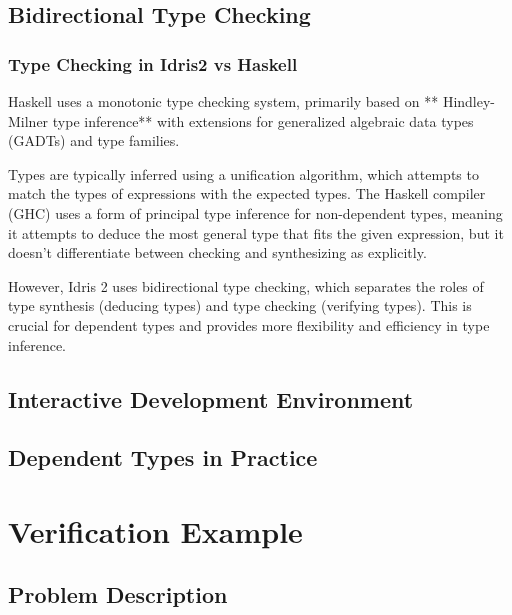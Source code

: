 \documentclass[]{rptuseminar}
\begin{document}
\subsection{Bidirectional Type Checking}
\subsubsection{Type Checking in Idris2 vs Haskell}
Haskell uses a monotonic type checking system, primarily based on ** Hindley-Milner type inference** with extensions for generalized algebraic data types (GADTs) and type families.

Types are typically inferred using a unification algorithm, which attempts to match the types of expressions with the expected types.
The Haskell compiler (GHC) uses a form of principal type inference for non-dependent types, meaning it attempts to deduce the most general type that fits the given expression, but it doesn't differentiate between checking and synthesizing as explicitly.

However, Idris 2 uses bidirectional type checking, which separates the roles of type synthesis (deducing types) and type checking (verifying types). This is crucial for dependent types and provides more flexibility and efficiency in type inference.

\subsection{Interactive Development Environment}  
\label{subsec:ide}  

\subsection{Dependent Types in Practice}  
\label{subsec:dependent-types}  

\section{Verification Example}  
\label{sec:verification-example}  
\subsection{Problem Description}  
\label{subsec:problem-desc}  
\end{document}
